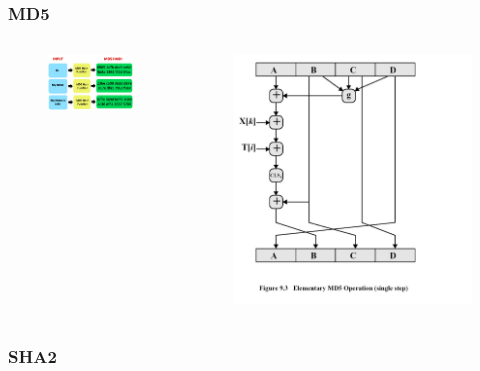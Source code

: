 \documentclass{beamer}
\begin{document}
\begin{frame}
\frametitle{MD5}
\begin{columns}[c] %

\begin{figure}
\includegraphics[width=0.8\linewidth]{md5.jpg}
\end{figure}

\begin{figure}
\includegraphics[width=0.8\linewidth]{diagram.jpg}
\end{figure}
\end{columns}
\end{frame}

\subsubsection{SHA2}
\end{document}
